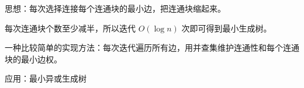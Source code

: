 思想：每次选择连接每个连通块的最小边，把连通块缩起来。

每次连通块个数至少减半，所以迭代 $O(\log n)$ 次即可得到最小生成树。

一种比较简单的实现方法：每次迭代遍历所有边，用并查集维护连通性和每个连通块的最小边权。

应用：最小异或生成树
